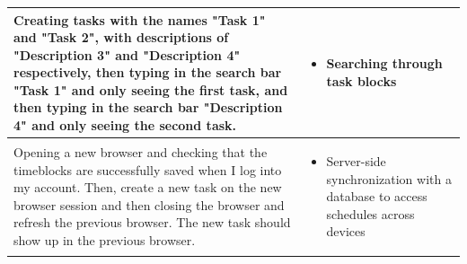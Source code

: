 \documentclass[12pt]{report}
\begin{document}
\begin{xltabular}{\linewidth}{|X|X|}
	Creating tasks with the names "Task 1" and "Task 2", with descriptions of "Description 3" and "Description 4" respectively, then typing in the search bar "Task 1" and only seeing the first task, and then typing in the search bar "Description 4" and only seeing the second task.
	&
	\vspace{-5mm}
	\begin{itemize}
		\item Searching through task blocks
	\end{itemize}
	\\\hline
	Opening a new browser and checking that the timeblocks are successfully saved when I log into my account. Then, create a new task on the new browser session and then closing the browser and refresh the previous browser. The new task should show up in the previous browser.
	&
	\vspace{-5mm}
	\begin{itemize}
		\item Server-side synchronization with a database to access schedules across devices
	\end{itemize}
	\\\hline
\end{xltabular}
\end{document}
